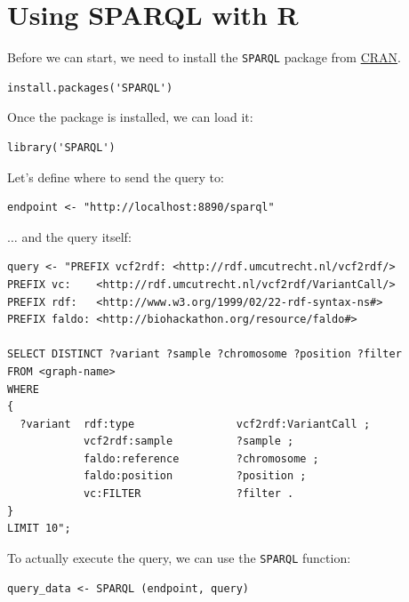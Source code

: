 \documentclass[11pt,a4paper,oneside]{book}
\begin{document}
\section{Using SPARQL with R}
\label{sec:sparql-with-r}

  Before we can start, we need to install the \texttt{SPARQL} package from
  \href{https://cran.r-project.org/web/packages/SPARQL/index.html}{CRAN}.

\begin{siderules}
\begin{verbatim}
install.packages('SPARQL')
\end{verbatim}
\end{siderules}

  Once the package is installed, we can load it:

\begin{siderules}
\begin{verbatim}
library('SPARQL')
\end{verbatim}
\end{siderules}

  Let's define where to send the query to:
\begin{siderules}
\begin{verbatim}
endpoint <- "http://localhost:8890/sparql"
\end{verbatim}
\end{siderules}

  $\ldots{}$ and the query itself:
\begin{siderules}
\begin{verbatim}
query <- "PREFIX vcf2rdf: <http://rdf.umcutrecht.nl/vcf2rdf/>
PREFIX vc:    <http://rdf.umcutrecht.nl/vcf2rdf/VariantCall/>
PREFIX rdf:   <http://www.w3.org/1999/02/22-rdf-syntax-ns#>
PREFIX faldo: <http://biohackathon.org/resource/faldo#>

SELECT DISTINCT ?variant ?sample ?chromosome ?position ?filter
FROM <graph-name>
WHERE
{
  ?variant  rdf:type                vcf2rdf:VariantCall ;
            vcf2rdf:sample          ?sample ;
            faldo:reference         ?chromosome ;
            faldo:position          ?position ;
            vc:FILTER               ?filter .
}
LIMIT 10";
\end{verbatim}
\end{siderules}

  To actually execute the query, we can use the \texttt{SPARQL} function:
\begin{siderules}
\begin{verbatim}
query_data <- SPARQL (endpoint, query)
\end{verbatim}
\end{siderules}
\end{document}
